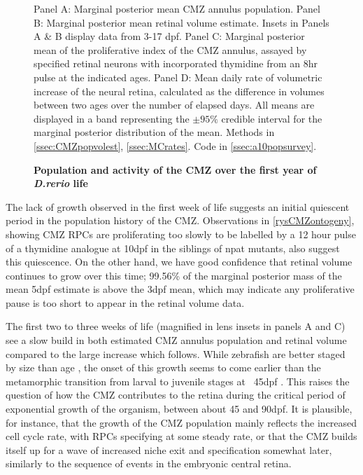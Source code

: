 \begin{figure}[!h]
    \caption{{\bf Population and activity of the CMZ over the first year of \textit{D.rerio} life}}
    Panel A: Marginal posterior mean CMZ annulus population. Panel B: Marginal posterior mean retinal volume estimate. Insets in Panels A \& B display data from 3-17 dpf. Panel C: Marginal posterior mean of the proliferative index of the CMZ annulus, assayed by specified retinal neurons with incorporated thymidine from an 8hr pulse at the indicated ages. Panel D: Mean daily rate of volumetric increase of the neural retina, calculated as the difference in volumes between two ages over the number of elapsed days. All means are displayed in a band representing the $\pm 95 \%$ credible interval for the marginal posterior distribution of the mean.
    \label{CMZoverall}
    Methods in \autoref{ssec:CMZpopvolest}, \autoref{ssec:MCrates}.
    Code in \autoref{ssec:a10popsurvey}.
\end{figure}

The lack of growth observed in the first week of life suggests an initial quiescent period in the population history of the CMZ. Observations in \autoref{rysCMZontogeny}, showing CMZ RPCs are proliferating too slowly to be labelled by a 12 hour pulse of a thymidine analogue at 10dpf in the siblings of npat mutants, also suggest this quiescence. On the other hand, we have good confidence that retinal volume continues to grow over this time; 99.56\% of the marginal posterior mass of the mean 5dpf estimate is above the 3dpf mean, which may indicate any proliferative pause is too short to appear in the retinal volume data.

The first two to three weeks of life (magnified in lens insets in panels A and C) see a slow build in both estimated CMZ annulus population and retinal volume compared to the large increase which follows. While zebrafish are better staged by size than age \cite{Parichy2009}, the onset of this growth seems to come earlier than the metamorphic transition from larval to juvenile stages at ~45dpf \cite{Singleman2014}. This raises the question of how the CMZ contributes to the retina during the critical period of exponential growth of the organism, between about 45 and 90dpf. It is plausible, for instance, that the growth of the CMZ population mainly reflects the increased cell cycle rate, with RPCs specifying at some steady rate, or that the CMZ builds itself up for a wave of increased niche exit and specification somewhat later, similarly to the sequence of events in the embryonic central retina.

